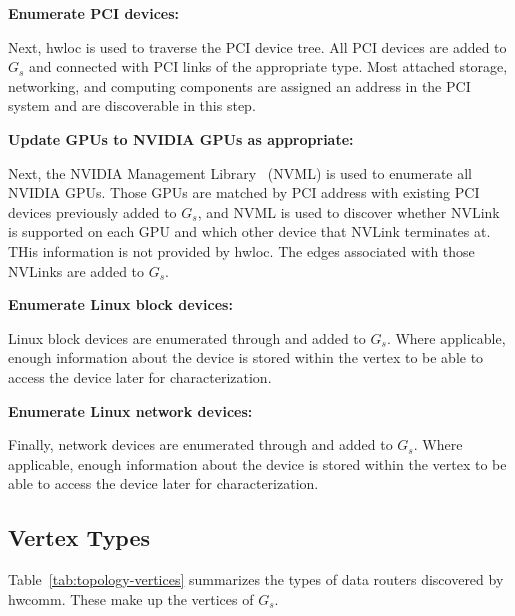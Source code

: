 \textbf{Enumerate PCI devices:}

Next, hwloc is used to traverse the PCI device tree.
All PCI devices are added to $G_s$ and connected with PCI links of the appropriate type.
Most attached storage, networking, and computing components are assigned an address in the PCI system and are discoverable in this step.


\textbf{Update GPUs to NVIDIA GPUs as appropriate:}

Next, the NVIDIA Management Library~\cite{nvidia2017nvml} (NVML) is used to enumerate all NVIDIA GPUs.
Those GPUs are matched by PCI address with existing PCI devices previously added to $G_s$, and NVML is used to discover whether NVLink is supported on each GPU and which other device that NVLink terminates at.
THis information is not provided by hwloc.
The edges associated with those NVLinks are added to $G_s$.


\textbf{Enumerate Linux block devices:}

Linux block devices are enumerated through  and added to $G_s$.
Where applicable, enough information about the device is stored within the vertex to be able to access the device later for characterization.

\textbf{Enumerate Linux network devices:}

Finally, network devices are enumerated through  and added to $G_s$.
Where applicable, enough information about the device is stored within the vertex to be able to access the device later for characterization.

\subsection{Vertex Types}
\label{sec:system-vertices}

Table~\ref{tab:topology-vertices} summarizes the types of data routers discovered by hwcomm.
These make up the vertices of $G_s$.

